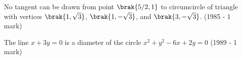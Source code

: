 \iffalse
\title{Circles}
\author{EE24Btech11022 - Eshan sharma}
\section{true-false}
\fi

    \item No tangent can be drawn from point $\brak{5/2, 1}$ to circumcircle of triangle with vertices $\brak{1, \sqrt{3}}$, $\brak{1, -\sqrt{3}}$, and $\brak{3, -\sqrt{3}}$.
    \hfill{(1985 - 1 mark)}
    \item The line $x+3y = 0$ is a diameter of the circle $ x^{2} + y^{2} - 6x +2y = 0$
    \hfill{(1989 - 1 mark)}
%
